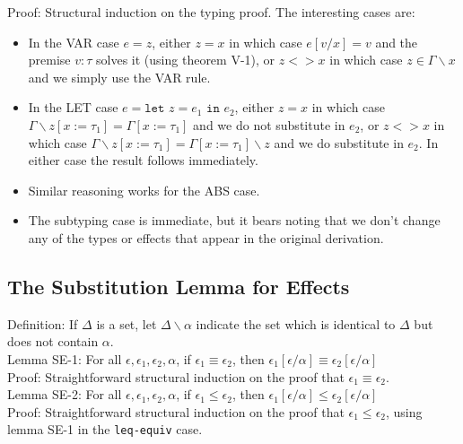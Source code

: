 \documentclass{article}
\begin{document}
\noindent Proof: Structural induction on the typing proof. The interesting cases are:

\begin{itemize}
	\item In the VAR case $e = z$, either $z = x$ in which case $e[v/x] = v$ and the premise $v : \tau$ solves it (using theorem V-1), or $z <> x$ in which case $z \in \Gamma\backslash x$ and we simply use the VAR rule.
	\item In the LET case $e = \texttt{let } z = e_1 \texttt{ in }e_2$, either $z = x$ in which case $\Gamma\backslash z[x := \tau_1] = \Gamma[x := \tau_1]$ and we do not substitute in $e_2$, or $z <> x$ in which case $\Gamma\backslash z[x := \tau_1] = \Gamma[x := \tau_1]\backslash z$ and we do substitute in $e_2$. In either case the result follows immediately.
	\item Similar reasoning works for the ABS case.
	\item The subtyping case is immediate, but it bears noting that we don't change any of the types or effects that appear in the original derivation.
\end{itemize}

\subsection*{The Substitution Lemma for Effects}

\noindent Definition: If $\Delta$ is a set, let $\Delta \backslash \alpha$ indicate the set which is identical to $\Delta$ but does not contain $\alpha$.
\\

\noindent Lemma SE-1: For all $\epsilon, \epsilon_1, \epsilon_2, \alpha$, if $\epsilon_1 \equiv \epsilon_2$, then $\epsilon_1[\epsilon/\alpha] \equiv \epsilon_2[\epsilon/\alpha]$
\\

\noindent Proof: Straightforward structural induction on the proof that $\epsilon_1 \equiv \epsilon_2$.
\\

\noindent Lemma SE-2: For all $\epsilon, \epsilon_1, \epsilon_2, \alpha$, if $\epsilon_1 \leq \epsilon_2$, then $\epsilon_1[\epsilon/\alpha] \leq \epsilon_2[\epsilon/\alpha]$
\\

\noindent Proof: Straightforward structural induction on the proof that $\epsilon_1 \leq \epsilon_2$, using lemma SE-1 in the \texttt{leq-equiv} case.
\\
\end{document}
